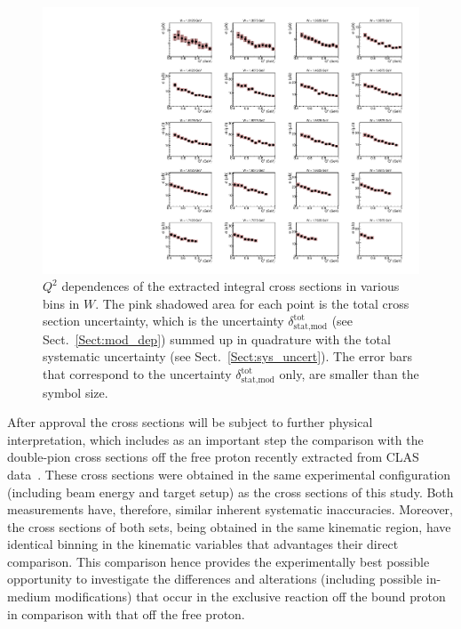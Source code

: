 \begin{figure}[htp]
\begin{center}
\includegraphics[width=\textwidth]{pictures/conclusion/q2_dep_new.pdf}
\caption{\small $Q^{2}$ dependences of the extracted integral cross sections in various bins in $W$. The pink shadowed area for each point is the total cross section uncertainty, which is the uncertainty $\delta_{\text{stat,mod}}^{\text{tot}}$ (see Sect.~\ref{Sect:mod_dep}) summed up in quadrature with the total systematic uncertainty (see Sect.~\ref{Sect:sys_uncert}). The error bars that correspond to the uncertainty $\delta_{\text{stat,mod}}^{\text{tot}}$ only, are smaller than the symbol size.  } \label{fig:int_q2_dep}
\end{center}
\end{figure}


After approval the cross sections will be subject to further physical interpretation, which includes as an important step the comparison with the double-pion cross sections off the free proton recently extracted from CLAS data~\cite{Fed_an_note:2017,Fed_paper_2018}. These cross sections were obtained in the same experimental configuration (including beam energy and target setup) as the cross sections of this study. Both measurements have, therefore, similar inherent systematic inaccuracies. Moreover, the cross sections of both sets, being obtained in the same kinematic region, have identical binning in the kinematic variables that advantages their direct comparison. This comparison hence provides the experimentally best possible opportunity to investigate the differences and alterations (including possible in-medium modifications) that occur in the exclusive reaction off the bound proton in comparison with that off the free proton.

